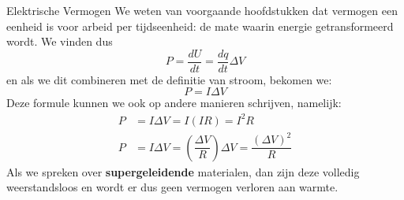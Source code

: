 \begin{theo}{Elektrische Vermogen}
    We weten van voorgaande hoofdstukken dat vermogen een eenheid is voor arbeid per tijdseenheid: de mate waarin energie getransformeerd wordt. We vinden dus
    \begin{equation*}
        P = \dfrac{dU}{dt} = \dfrac{dq}{dt}\Delta V
    \end{equation*}
    en als we dit combineren met de definitie van stroom, bekomen we:
    \begin{equation*}
        P = I\Delta V
    \end{equation*}
    Deze formule kunnen we ook op andere manieren schrijven, namelijk:
    \begin{align*}
        P &=  I\Delta V= I(IR) = I^2R\\
        P &= I\Delta V = (\dfrac{\Delta V}{R})\Delta V = \dfrac{(\Delta V)^2}{R}
    \end{align*}
    Als we spreken over \textbf{supergeleidende} materialen, dan zijn deze volledig weerstandsloos en wordt er dus geen vermogen verloren aan warmte.
\end{theo}





    

    


